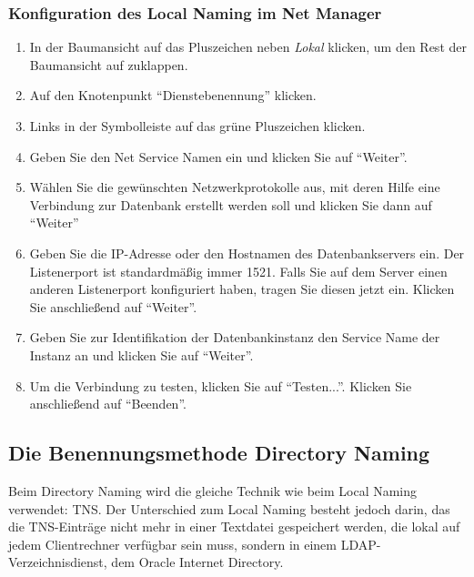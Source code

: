         \subsubsection{Konfiguration des Local Naming im Net Manager}
          \begin{enumerate}
            \item In der Baumansicht auf das Pluszeichen neben \textit{Lokal} klicken, um den Rest der Baumansicht auf zuklappen.
            \item Auf den Knotenpunkt \enquote{Dienstebenennung} klicken.
            \item Links in der Symbolleiste auf das gr\"une Pluszeichen klicken.
            \item Geben Sie den Net Service Namen ein und klicken Sie auf \enquote{Weiter}.
\clearpage
            \item W\"ahlen Sie die gew\"unschten Netzwerkprotokolle aus, mit deren Hilfe eine Verbindung zur Datenbank erstellt werden soll und klicken Sie dann auf \enquote{Weiter}
            \item Geben Sie die IP-Adresse oder den Hostnamen des Datenbankservers ein. Der Listenerport ist standardm\"a\ss{}ig immer 1521. Falls Sie auf dem Server einen anderen Listenerport konfiguriert haben, tragen Sie diesen jetzt ein. Klicken Sie anschlie\ss end auf \enquote{Weiter}.
\clearpage
            \item Geben Sie zur Identifikation der Datenbankinstanz den Service Name der Instanz an und klicken Sie auf \enquote{Weiter}.
            \item Um die Verbindung zu testen, klicken Sie auf \enquote{Testen...}. Klicken Sie anschlie\ss end auf \enquote{Beenden}.
\clearpage

          \end{enumerate}
      \subsection{Die Benennungsmethode Directory Naming}
        Beim Directory Naming wird die gleiche Technik wie beim Local Naming verwendet: TNS. Der Unterschied zum Local Naming besteht jedoch darin, das die TNS-Eintr\"age nicht mehr in einer Textdatei gespeichert werden, die lokal auf jedem Clientrechner verf\"ugbar sein muss, sondern in einem LDAP-Verzeichnisdienst, dem Oracle Internet Directory.

